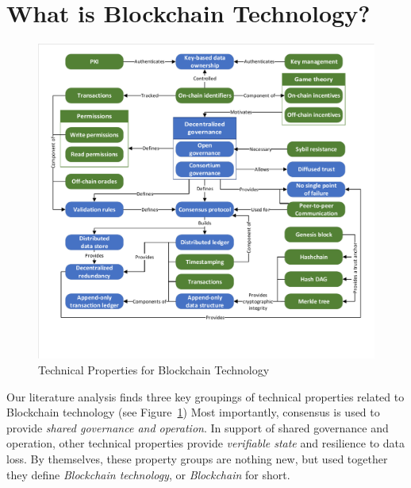 
\section{What is Blockchain Technology?}
\label{sec:blockchain}

\begin{figure}
	\centering
	\includegraphics[page=2,width=\columnwidth]{figures/grounded-theory-main}
	
	\caption{Technical Properties for Blockchain Technology}
	\label{fig:technical-properties}
\end{figure}

Our literature analysis finds three key groupings of technical properties related to Blockchain technology (see Figure~\ref{fig:technical-properties})
Most importantly, consensus is used to provide \textit{shared governance and operation}.
In support of shared governance and operation, other technical properties provide \textit{verifiable state} and {resilience to data loss}.
By themselves, these property groups are nothing new, but used together they define \emph{Blockchain technology}, or \emph{Blockchain} for short.

